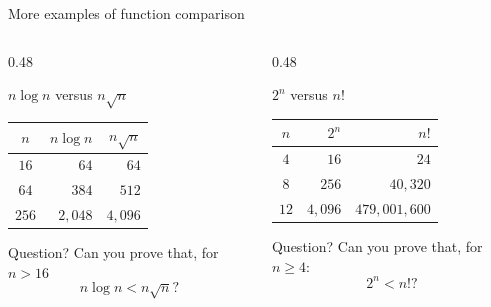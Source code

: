 \documentclass[aspectratio=169]{beamer}
\begin{document}
\begin{frame}{More examples of function comparison}
  \small
  \begin{columns}[T]
    \begin{column}{0.48\textwidth}
      \begin{block}{$n\log n$ versus $n\sqrt{n}$}
        \centering\scriptsize
        \begin{tabular}{c|r|r}
          \toprule
          $n$ & $n\log n$ & $n\sqrt{n}$ \\
          \midrule
          $16$ & $64$ & $64$ \\
          $64$ & $384$ & $512$ \\
          $256$ & $2{,}048$ & $4{,}096$ \\
          \bottomrule
        \end{tabular}
      \end{block}
      \begin{exampleblock}{Question?}
       Can you prove that, for $n>16$
        \[
          n\log n < n\sqrt n?
        \]
      \end{exampleblock}
    \end{column}
    \begin{column}{0.48\textwidth}
      \begin{block}{$2^n$ versus $n!$}
        \centering\scriptsize
        \begin{tabular}{c|r|r}
          \toprule
          $n$ & $2^n$ & $n!$ \\
          \midrule
          $4$ & $16$ & $24$ \\
          $8$ & $256$ & $40{,}320$ \\
          $12$ & $4{,}096$ & $479{,}001{,}600$ \\
          \bottomrule
        \end{tabular}
      \end{block}
      \begin{alertblock}{Question?}
        Can you prove that, for $n \ge 4$:
        \[
          2^n < n!?
        \]
      \end{alertblock}
    \end{column}
  \end{columns}
  
\end{frame}
\end{document}
